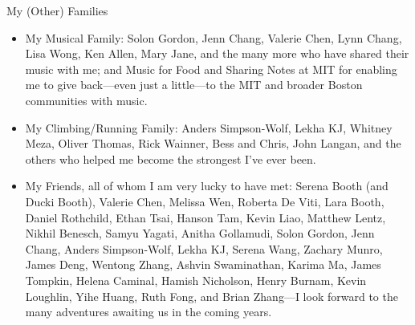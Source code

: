 \begin{center}{My (Other) Families}\end{center} 
    \begin{itemize}
    \item My Musical Family: Solon Gordon, Jenn Chang, Valerie Chen, Lynn Chang,
        Lisa Wong, Ken Allen, Mary Jane, and the many more who have shared their
            music with me; and Music for Food and Sharing Notes at MIT for
            enabling me to give back---even just a little---to the MIT and
            broader Boston communities with music.    

    \item My Climbing/Running Family: Anders Simpson-Wolf, Lekha KJ, Whitney
        Meza, Oliver Thomas, Rick Wainner, Bess and Chris, John Langan, and the
            others who helped me become the strongest I've ever been.

    \item My Friends, all of whom I am very lucky to have met: Serena Booth (and
        Ducki Booth), Valerie Chen, Melissa Wen, Roberta De Viti, Lara Booth,
            Daniel Rothchild, Ethan Tsai, Hanson Tam, Kevin Liao, Matthew Lentz,
            Nikhil Benesch, Samyu Yagati, Anitha Gollamudi, Solon Gordon, Jenn
            Chang, Anders Simpson-Wolf,
            Lekha KJ, Serena Wang, Zachary Munro, James Deng, Wentong Zhang,
            Ashvin Swaminathan, Karima Ma, James Tompkin, Helena Caminal, Hamish
            Nicholson, Henry Burnam, Kevin Loughlin, Yihe Huang, Ruth Fong, and
            Brian Zhang---I look forward to the many adventures awaiting us in
            the coming years.
    \end{itemize}
 
